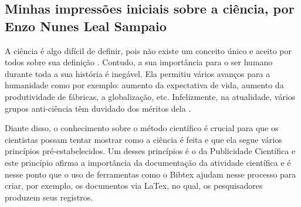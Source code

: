 \subsection{Minhas impressões iniciais sobre a ciência, por Enzo Nunes Leal Sampaio}

A ciência é algo difícil de definir, pois não existe um conceito único e aceito por todos sobre sua definição \citet{schwartzman_ciencia_1984}. Contudo, a sua importância para o ser humano durante toda a sua história é inegável. Ela permitiu vários avanços para a humanidade como por exemplo: aumento da expectativa de vida, aumento da produtividade de fábricas, a globalização, etc. Infelizmente, na atualidade, vários grupos anti-ciência têm duvidado dos méritos dela \citet{scherma_relatos_2020}.

Diante disso, o conhecimento sobre o método científico é crucial para que os cientistas possam tentar mostrar como a ciência é feita e que ela segue vários princípios pré-estabelecidos. Um desses princípios é o da Publicidade Científica e este princípio afirma a importância da documentação da atividade científica e é nesse ponto que o uso de ferramentas como o Bibtex \citet{wikipedia_bibtex_2017} ajudam nesse processo para criar, por exemplo, os documentos via LaTex, no qual, os pesquisadores produzem seus registros.